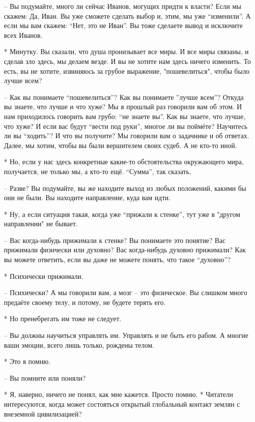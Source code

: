  – Вы подумайте, много ли сейчас Иванов, могущих придти к власти? Если мы скажем: Да, Иван. Вы уже сможете сделать выбор и, этим, мы уже “изменили”. А если мы вам скажем: “Нет, это не Иван”. Вы тоже сделаете вывод и исключите всех Иванов.

 * Минутку. Вы сказали, что душа пронизывает все миры. И все миры связаны, и сделав зло здесь, мы делаем везде. И вы не хотите нам здесь ничего изменить. То есть, вы не хотите, извиняюсь за грубое выражение, "пошевелиться", чтобы было лучше всем?

 – Как вы понимаете “пошевелиться”? Как вы понимаете ”лучше всем”? Откуда вы знаете, что лучше и что хуже? Мы в прошлый раз говорили вам об этом. И нам приходилось говорить вам грубо: “не знаете вы”. Как вы знаете, что лучше, что хуже? И если вас будут “вести под руки”, многое ли вы поймёте? Научитесь ли вы “ходить”? И что вы получите? Мы говорили вам о задачнике и об ответах. Далее, мы хотим, чтобы вы были вершителем своих судеб. А не кто-то иной.

 * Но, если у нас здесь конкретные какие-то обстоятельства окружающего мира, получается, не только мы, а кто-то ещё. “Сумма”, так сказать.

 – Разве? Вы подумайте, вы же находите выход из любых положений, какими бы они не были. Вы находите направление, куда вам идти.

 * Ну, а если ситуация такая, когда уже “прижали к стенке”, тут уже в "другом направлении" не бывает.

 – Вас когда-нибудь прижимали к стенке? Вы понимаете это понятие? Вас прижимали физически или духовно? Вас когда-нибудь духовно прижимали? Как вы можете ответить, если вы даже не можете понять, что такое “духовно”?

 * Психически прижимали.

 – Психически? А мы говорили вам, а мозг – это физическое. Вы слишком много предаёте своему телу, и потому, не будете терять его.

 * Но пренебрегать им тоже не следует.

 – Вы должны научиться управлять им. Управлять и не быть его рабом. А многие ваши эмоции, всего лишь только, рождены телом.

 * Это я помню.

 – Вы помните или поняли?

 * Я, наверно, ничего не понял, как мне кажется. Просто помню.
 * Читатели интересуются, когда может состояться открытый глобальный контакт землян с внеземной цивилизацией?


